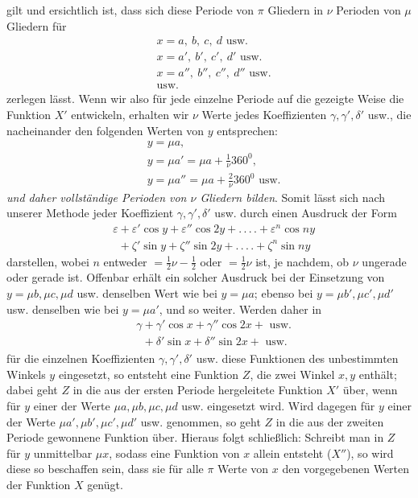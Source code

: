 gilt und ersichtlich ist, dass sich diese Periode von $\pi$ Gliedern in $\nu$ Perioden von $\mu$ Gliedern für
\[
\begin{aligned}
&x=a,\ b,\ c,\ d\text{ usw.}\\[5pt]
&x=a',\ b',\ c',\ d'\text{ usw.}\\[5pt]
&x=a'',\ b'',\ c'',\ d''\text{ usw.}\\[5pt]
&\text{usw.}
\end{aligned}
\]
zerlegen lässt. Wenn wir also für jede einzelne Periode auf die gezeigte Weise die Funktion
$X'$ entwickeln, erhalten wir $\nu$ Werte jedes Koeffizienten $\gamma,\gamma',\delta'$ usw., die nacheinander den folgenden Werten von $y$ entsprechen:
\[
\begin{aligned}
&y=\mu a,\\[5pt]
& y=\mu a'=\mu a+\tfrac1\nu360^0,\\[5pt]
& y=\mu a''=\mu a+\tfrac2\nu360^0\text{ usw.}
\end{aligned}
\]
\textit{und daher vollständige Perioden von $\nu$ Gliedern bilden}. 
Somit lässt sich nach unserer Methode jeder Koeffizient $\gamma,\gamma',\delta'$ usw. durch einen Ausdruck der Form
\[
\begin{aligned}
&\varepsilon+\varepsilon'\cos y+\varepsilon''\cos2y+.\,.\,.\,.+\varepsilon^n\cos ny\\[5pt]
&\phantom{\varepsilon}+\zeta'\sin y+\zeta''\sin2y+.\,.\,.\,.+\zeta^n\sin ny
\end{aligned}
\]
darstellen, wobei $n$ entweder $=\tfrac12\nu-\tfrac12$ oder $=\tfrac12\nu$ ist, je nachdem, ob $\nu$ ungerade oder gerade ist. Offenbar erhält ein solcher Ausdruck bei der Einsetzung von $y=\mu b,\mu c,\mu d$ usw. denselben Wert wie bei $y=\mu a$; ebenso bei $y=\mu b',\mu c',\mu d'$ usw. denselben wie bei $y=\mu a'$, und so weiter. Werden daher in
\[
\begin{aligned}
&\gamma+\gamma'\cos x+\gamma''\cos2x+\text{ usw.}\\[5pt]
&\phantom{\gamma}+\delta'\sin x+\delta''\sin2x+\text{ usw.}
\end{aligned}
\]
für die einzelnen Koeffizienten $\gamma,\gamma',\delta'$ usw. diese Funktionen des unbestimmten Winkels $y$ eingesetzt, so entsteht eine Funktion $Z$, die zwei Winkel $x,y$ enthält; dabei geht $Z$ in die aus der ersten Periode hergeleitete Funktion $X'$ über, wenn für $y$ einer der Werte $\mu a,\mu b,\mu c,\mu d$ usw. eingesetzt wird. Wird dagegen für $y$ einer der Werte $\mu a',\mu b',\mu c',\mu d'$ usw. genommen, so geht $Z$ in die aus der zweiten Periode gewonnene Funktion über. Hieraus folgt schließlich: Schreibt man in $Z$ für $y$ unmittelbar $\mu x$, sodass eine Funktion von $x$ allein entsteht ($X''$), so wird diese so beschaffen sein, dass sie für alle $\pi$ Werte von $x$ den vorgegebenen Werten der Funktion $X$ genügt.

\endgroup
